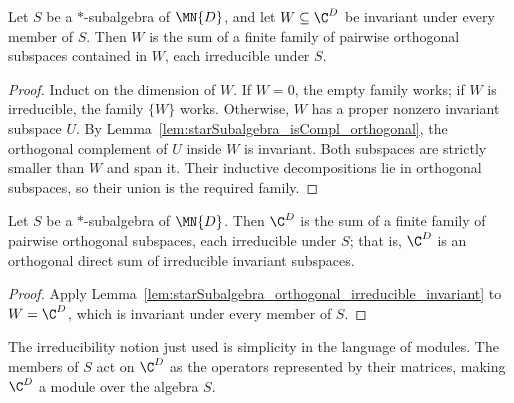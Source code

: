 \begin{lemma}%
    \label{lem:starSubalgebra_orthogonal_irreducible_invariant}
    \leanok
    Let $S$ be a $*$-subalgebra of $\MN{D}$, and let
    $W\subseteq\C^D$ be invariant under every member of $S$. Then $W$ is
    the sum of a finite family of pairwise orthogonal subspaces contained in
    $W$, each irreducible under $S$.
\end{lemma}

\begin{proof}
    \leanok
    Induct on the dimension of $W$. If $W=0$, the empty family works; if
    $W$ is irreducible, the family $\{W\}$ works. Otherwise, $W$ has a
    proper nonzero invariant subspace $U$. By
    Lemma~\ref{lem:starSubalgebra_isCompl_orthogonal}, the orthogonal
    complement of $U$ inside $W$ is invariant. Both subspaces are strictly
    smaller than $W$ and span it. Their inductive decompositions lie in
    orthogonal subspaces, so their union is the required family.
\end{proof}

\begin{theorem}%
    \label{thm:starSubalgebra_orthogonal_irreducible_decomposition}
    \leanok
    Let $S$ be a $*$-subalgebra of $\MN{D}$. Then $\C^D$ is the sum of a
    finite family of pairwise orthogonal subspaces, each irreducible under
    $S$; that is, $\C^D$ is an orthogonal direct sum of irreducible
    invariant subspaces.
\end{theorem}

\begin{proof}
    \leanok
    Apply
    Lemma~\ref{lem:starSubalgebra_orthogonal_irreducible_invariant} to
    $W=\C^D$, which is invariant under every member of $S$.
\end{proof}

The irreducibility notion just used is simplicity in the language of modules.
The members of $S$ act on $\C^D$ as the operators represented by their
matrices, making $\C^D$ a module over the algebra $S$.

